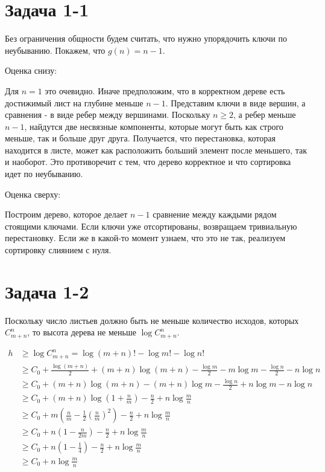 \documentclass{article}
\renewcommand{\ge}{\geqslant}  %
\begin{document}
\section{Задача 1-1}

Без ограничения общности будем считать, что нужно упорядочить ключи по неубыванию. Покажем, что $g(n) = n-1$.

Оценка снизу:

Для $n=1$ это очевидно. Иначе предположим, что в корректном дереве есть достижимый лист на глубине меньше $n-1$. Представим ключи в виде вершин, а сравнения - в виде ребер между вершинами. Поскольку $n\ge2$, а ребер меньше $n-1$, найдутся две несвязные компоненты, которые могут быть как строго меньше, так и больше друг друга. Получается, что перестановка, которая находится в листе, может как расположить больший элемент после меньшего, так и наоборот. Это противоречит с тем, что дерево корректное и что сортировка идет по неубыванию.

Оценка сверху:

Построим дерево, которое делает $n-1$ сравнение между каждыми рядом стоящими ключами. Если ключи уже отсортированы, возвращаем тривиальную перестановку. Если же в какой-то момент узнаем, что это не так, реализуем сортировку слиянием с нуля.

\section{Задача 1-2}

Поскольку число листьев должно быть не меньше количество исходов, которых $C_{m+n}^n$, то высота дерева не меньше $\log{C_{m+n}^n}$.

\begin{align*}
h &\ge \log{C_{m+n}^n} = \log(m+n)! - \log m! - \log n!  \\
&\ge C_0 + \frac{\log(m+n)}{2}+ (m+n)\log(m+n) - \frac{\log m}{2} - m\log m
- \frac{\log n}{2} - n\log n \\
&\ge C_0 + (m+n)\log(m+n) - (m+n)\log m - \frac{\log n}{2} + n\log m - n\log n\\
&\ge C_0 + (m+n)\log(1+\frac{n}{m}) - \frac{n}{2} + n\log \frac{m}{n}  \\
&\ge C_0 + m\left(\frac{n}{m} - \frac{1}{2}\left(\frac{n}{m}\right)^2 \right)- \frac{n}{2} + n\log \frac{m}{n}  \\
&\ge C_0 + n\left(1 - \frac{n}{2m}\right)- \frac{n}{2} + n\log \frac{m}{n}  \\
&\ge C_0 + n\left(1 - \frac{1}{4}\right)- \frac{n}{2} + n\log \frac{m}{n}  \\
&\ge C_0 + n\log \frac{m}{n}  \\
\end{align*}
\end{document}
